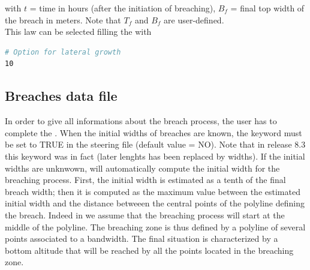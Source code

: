with $t$ = time in hours (after the initiation of breaching), $B_f$ = final top
width of the breach in meters. Note that $T_f$ and $B_f$ are user-defined.\\
This law can be selected filling the  with
\begin{lstlisting}[language=bash]
# Option for lateral growth
10
\end{lstlisting}
\subsection{Breaches data file}
In order to give all informations about the breach process, the user has to
complete the .
When the initial widths of breaches are known, the keyword
 must be set to TRUE in the steering file
(default value = NO). Note that in release 8.3 this keyword was in fact
 (later lenghts has been replaced by widths).
If the initial widths are unknwown,  will automatically compute the
initial width for the breaching process. First, the initial width is estimated
as a tenth of the final breach width;
then it is computed as the maximum value between the estimated initial width
and the distance betweeen the central points of the polyline defining the breach.
Indeed in  we assume that the breaching process will start at the
middle of the polyline.
The breaching zone is thus defined by a polyline of several points associated
to a bandwidth.
The final situation is characterized by a bottom altitude that will be reached
by all the points located in the breaching zone.

